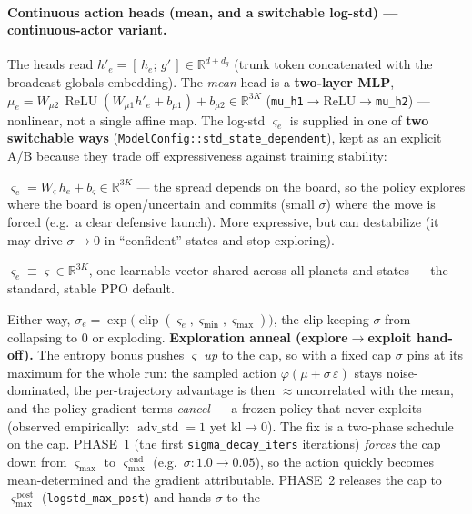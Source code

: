 \documentclass[11pt]{article}
\newcommand{\R}{\mathbb{R}}
\newcommand{\relu}{\operatorname{ReLU}}
\newcommand{\clip}{\operatorname{clip}}
\begin{document}
\paragraph{Continuous action heads (mean, and a switchable log-std) --- continuous-actor variant.} The heads read
$h'_e=[\,h_e;\,g'\,]\in\R^{d+d_g}$ (trunk token concatenated with the broadcast globals embedding). The
\emph{mean} head is a \textbf{two-layer MLP}, $\mu_e=W_{\mu 2}\,\relu(W_{\mu 1}h'_e+b_{\mu 1})+b_{\mu 2}\in\R^{3K}$
(\texttt{mu\_h1}$\to$ReLU$\to$\texttt{mu\_h2}) --- nonlinear, not a single affine map. The log-std
$\varsigma_e$ is supplied in one
of \textbf{two switchable ways} (\texttt{ModelConfig::std\_state\_dependent}), kept as an explicit
A/B because they trade off expressiveness against training stability:
\begin{description}[nosep,leftmargin=1.4em]
\item[State-dependent (a head):] $\varsigma_e = W_\varsigma\,h_e + b_\varsigma\in\R^{3K}$ --- the
spread depends on the board, so the policy explores where the board is open/uncertain and commits
(small $\sigma$) where the move is forced (e.g.\ a clear defensive launch). More expressive, but
can destabilize (it may drive $\sigma\!\to\!0$ in ``confident'' states and stop exploring).
\item[State-independent (a vector):] $\varsigma_e\equiv\varsigma\in\R^{3K}$, one learnable vector
shared across all planets and states --- the standard, stable PPO default.
\end{description}
Either way, $\sigma_e=\exp\!\big(\clip(\varsigma_e,\varsigma_{\min},\varsigma_{\max})\big)$, the
clip keeping $\sigma$ from collapsing to $0$ or exploding. \textbf{Exploration anneal (explore$\to$exploit
hand-off).} The entropy bonus pushes $\varsigma$ \emph{up} to the cap, so with a fixed cap $\sigma$ pins
at its maximum for the whole run: the sampled action $\varphi(\mu+\sigma\,\varepsilon)$ stays
noise-dominated, the per-trajectory advantage is then $\approx$uncorrelated with the mean, and the
policy-gradient terms \emph{cancel} --- a frozen policy that never exploits (observed empirically:
$\operatorname{adv\_std}=1$ yet $\mathrm{kl}\to0$). The fix is a two-phase schedule on the cap. PHASE~1
(the first \texttt{sigma\_decay\_iters} iterations) \emph{forces} the cap down from $\varsigma_{\max}$ to
$\varsigma_{\max}^{\,\mathrm{end}}$ (e.g.\ $\sigma:1.0\!\to\!0.05$), so the action quickly becomes
mean-determined and the gradient attributable. PHASE~2 releases the cap to
$\varsigma_{\max}^{\,\mathrm{post}}$ (\texttt{logstd\_max\_post}) and hands $\sigma$ to the
\end{document}
